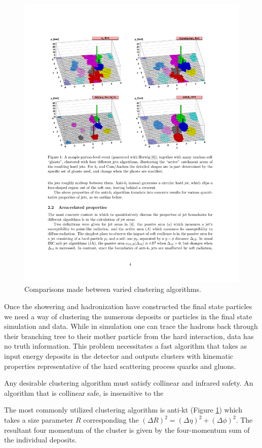 {\begin{figure}
\begin{center}
\includegraphics[width=.75\textwidth]{pics/antikt}
\end{center}
\caption{Comparisons made between varied clustering algorithms.}
\label{fig:antikt}
\end{figure}


Once the showering and hadronization have constructed the final state particles we need a way of clustering the numerous deposits or
particles in the final state simulation and data. While in simulation one can trace the
 hadrons back through their branching tree to their mother particle from the hard interaction,
data has no truth information. This problem necessitates a fast algorithm that takes as input energy deposits in the 
detector and outputs clusters with kinematic properties representative of the hard scattering process quarks and gluons. 

Any desirable clustering algorithm must satisfy collinear and infrared safety. An algorithm that is collinear safe, is insensitive to the 

The most commonly utilized clustering algorithm is anti-kt (Figure \ref{fig:antikt}) which takes a size 
parameter $R$ corresponding the $(\Delta R)^2 = (\Delta\eta)^2 + (\Delta \phi)^2$.  The resultant four momentum of
the cluster is given by the four-momentum sum of the individual deposits. 

}

